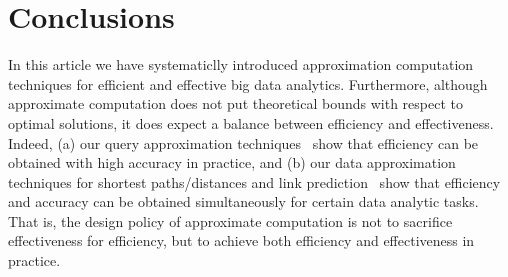 \section{Conclusions}
\label{sec-conclusion}

In this article we have systematiclly introduced approximation computation techniques for efficient and effective big data analytics.
Furthermore, although approximate computation does not put
theoretical bounds with respect to optimal solutions, it does expect a balance between efficiency and effectiveness. Indeed, (a) our query approximation techniques~\cite{tods-MaCFHW14,LinMZWH17,MaHWLH17} show that efficiency can be obtained with high accuracy in practice, and (b) our data approximation techniques for shortest paths/distances and link prediction~\cite{MaFLWCH16,DuanMAMH17} show that efficiency and accuracy can be obtained simultaneously for certain data analytic tasks. That is, the design policy of approximate computation is not to sacrifice effectiveness for efficiency, but to achieve both efficiency and effectiveness in practice.

